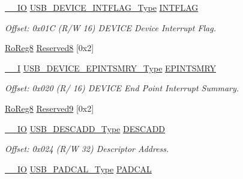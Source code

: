 \begin{DoxyCompactItemize}
\item 
\mbox{\hyperlink{core__cm0plus_8h_aec43007d9998a0a0e01faede4133d6be}{\+\_\+\+\_\+\+IO}} \mbox{\hyperlink{union_u_s_b___d_e_v_i_c_e___i_n_t_f_l_a_g___type}{U\+S\+B\+\_\+\+D\+E\+V\+I\+C\+E\+\_\+\+I\+N\+T\+F\+L\+A\+G\+\_\+\+Type}} \mbox{\hyperlink{struct_usb_device_a2aff6e5d29d7634e892def505df651f3}{I\+N\+T\+F\+L\+AG}}
\begin{DoxyCompactList}\small\item\em Offset\+: 0x01C (R/W 16) D\+E\+V\+I\+CE Device Interrupt Flag. \end{DoxyCompactList}\item 
\mbox{\hyperlink{group___s_a_m_d21_e15_a__definitions_ga0d957f1433aaf5d70e4dc2b68288442d}{Ro\+Reg8}} \mbox{\hyperlink{struct_usb_device_a61a0842f78678970cfc266608a1d201e}{Reserved8}} \mbox{[}0x2\mbox{]}
\item 
\mbox{\hyperlink{core__cm0plus_8h_af63697ed9952cc71e1225efe205f6cd3}{\+\_\+\+\_\+I}} \mbox{\hyperlink{union_u_s_b___d_e_v_i_c_e___e_p_i_n_t_s_m_r_y___type}{U\+S\+B\+\_\+\+D\+E\+V\+I\+C\+E\+\_\+\+E\+P\+I\+N\+T\+S\+M\+R\+Y\+\_\+\+Type}} \mbox{\hyperlink{struct_usb_device_ab82d39ece90a8a9b80e0952a599bfdd9}{E\+P\+I\+N\+T\+S\+M\+RY}}
\begin{DoxyCompactList}\small\item\em Offset\+: 0x020 (R/ 16) D\+E\+V\+I\+CE End Point Interrupt Summary. \end{DoxyCompactList}\item 
\mbox{\hyperlink{group___s_a_m_d21_e15_a__definitions_ga0d957f1433aaf5d70e4dc2b68288442d}{Ro\+Reg8}} \mbox{\hyperlink{struct_usb_device_a7dfdc057ed9939b6708cf88cd831a0cc}{Reserved9}} \mbox{[}0x2\mbox{]}
\item 
\mbox{\hyperlink{core__cm0plus_8h_aec43007d9998a0a0e01faede4133d6be}{\+\_\+\+\_\+\+IO}} \mbox{\hyperlink{union_u_s_b___d_e_s_c_a_d_d___type}{U\+S\+B\+\_\+\+D\+E\+S\+C\+A\+D\+D\+\_\+\+Type}} \mbox{\hyperlink{struct_usb_device_a4e4a634e8fbb0f0489872f7a9ee41bc4}{D\+E\+S\+C\+A\+DD}}
\begin{DoxyCompactList}\small\item\em Offset\+: 0x024 (R/W 32) Descriptor Address. \end{DoxyCompactList}\item 
\mbox{\hyperlink{core__cm0plus_8h_aec43007d9998a0a0e01faede4133d6be}{\+\_\+\+\_\+\+IO}} \mbox{\hyperlink{union_u_s_b___p_a_d_c_a_l___type}{U\+S\+B\+\_\+\+P\+A\+D\+C\+A\+L\+\_\+\+Type}} \mbox{\hyperlink{struct_usb_device_a446e7b83e50d200ac238425577a31e5a}{P\+A\+D\+C\+AL}}

\end{DoxyCompactItemize}
